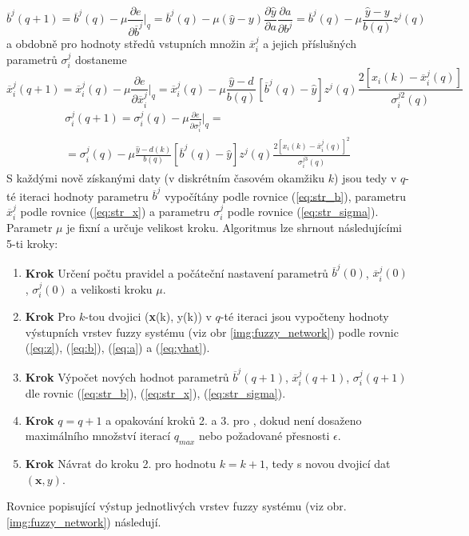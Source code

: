 \begin{equation}\label{eq:str_b}
    \overline{b}^j(q+1)=\overline{b}^j(q)-\mu\frac{\partial e}{\partial \overline{b}^j}\Big|_q=\overline{b}^j(q)-\mu(\hat{y}-y)\frac{\partial \hat{y}}{\partial a}\frac{\partial a}{\partial b^j}=\overline{b}^j(q)-\mu\frac{\hat{y}-y}{b(q)}z^j(q)
\end{equation}
a obdobně pro hodnoty středů vstupních množin $\overline{x}_i^j$ a jejich příslušných parametrů $\sigma_i^j$ dostaneme
\begin{equation}\label{eq:str_x}
    \overline{x}_i^j(q+1)=\overline{x}_i^j(q)-\mu\frac{\partial e}{\partial \overline{x}_i^j}\Big|_q=\overline{x}_i^j(q)-\mu\frac{\hat{y}-d}{b(q)}[\overline{b}^j(q)-\hat{y}]z^j(q)\frac{2[x_i(k)-\overline{x}_i^j(q)]}{\sigma_i^{j2}(q)}
\end{equation}
\begin{multline}\label{eq:str_sigma}
        \sigma_i^j(q+1)=\sigma_i^j(q)-\mu\frac{\partial e}{\partial \sigma_i^j}\Big|_q=\\= \sigma_i^j(q)-\mu\frac{\hat{y}-d(k)}{b(q)}[\overline{b}^j(q)-\hat{y}]z^j(q)\frac{2[x_i(k)-\overline{x}_i^j(q)]^2}{\sigma_i^{j3}(q)}
\end{multline}
S každými nově získanými daty (v diskrétním časovém okamžiku $k$) jsou tedy v $q$-té iteraci hodnoty parametru $\overline{b}^j$ vypočítány podle rovnice (\ref{eq:str_b}), parametru $\overline{x}_i^j$ podle rovnice (\ref{eq:str_x}) a parametru $\sigma_i^j$ podle rovnice (\ref{eq:str_sigma}). Parametr $\mu$ je fixní a určuje velikost kroku. 
Algoritmus lze shrnout následujícími 5-ti kroky:
\begin{enumerate}[\bfseries 1.]
        \item \textbf{Krok} Určení počtu pravidel a počáteční nastavení parametrů $\overline{b}^j(0)$, $\overline{x}_i^j(0)$, $\sigma_i^j(0)$ a velikosti kroku $\mu$.
        \item \textbf{Krok} Pro $k$-tou dvojici (\textbf{x}(k), y(k)) v $q$-té iteraci jsou vypočteny hodnoty výstupních vrstev fuzzy systému (viz obr \ref{img:fuzzy_network}) podle rovnic (\ref{eq:z}), (\ref{eq:b}), (\ref{eq:a}) a (\ref{eq:yhat}).
        \item \textbf{Krok} Výpočet nových hodnot parametrů $\overline{b}^j(q+1)$, $\overline{x}_i^j(q+1)$, $\sigma_i^j(q+1)$ dle rovnic (\ref{eq:str_b}), (\ref{eq:str_x}), (\ref{eq:str_sigma}).
        \item \textbf{Krok} $q=q+1$ a opakování kroků 2. a 3. pro , dokud není dosaženo maximálního množství iterací $q_{max}$ nebo požadované přesnosti $\epsilon$.
        \item \textbf{Krok} Návrat do kroku 2. pro hodnotu $k=k+1$, tedy s novou dvojicí dat $(\textbf{x}, y)$.
    \end{enumerate}
Rovnice popisující výstup jednotlivých vrstev fuzzy systému (viz obr. \ref{img:fuzzy_network}) následují.


